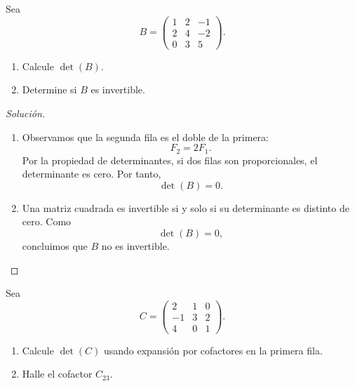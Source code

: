 \documentclass[a4,11pt]{aleph-notas}
\begin{document}
\begin{ejer}
    Sea
    \[
        B=
        \begin{pmatrix}
            1 & 2 & -1 \\
            2 & 4 & -2 \\
            0 & 3 & 5
        \end{pmatrix}.
    \]
    
    \begin{enumerate}
    \item 
        Calcule $\det(B)$.
    \item
        Determine si $B$ es invertible.
    \end{enumerate}
\end{ejer}

\begin{proof}[Solución]\hspace{0pt}
    \begin{enumerate}
    \item
        Observamos que la segunda fila es el doble de la primera:
        \[
            F_2 = 2F_1.
        \]
        Por la propiedad de determinantes, si dos filas son proporcionales, el determinante es cero. Por tanto,
        \[
            \det(B)=0.
        \]
    \item
        Una matriz cuadrada es invertible si y solo si su determinante es distinto de cero. Como
        \[
            \det(B)=0,
        \]
        concluimos que $B$ no es invertible.\qedhere
    \end{enumerate}
\end{proof}

\begin{ejer}
    Sea
    \[
        C=
        \begin{pmatrix}
            2 & 1 & 0 \\
            -1 & 3 & 2 \\
            4 & 0 & 1
        \end{pmatrix}.
    \]
    
    \begin{enumerate}
    \item
        Calcule $\det(C)$ usando expansión por cofactores en la primera fila.
    \item
        Halle el cofactor $C_{23}$.
    \end{enumerate}
\end{ejer}
\end{document}
